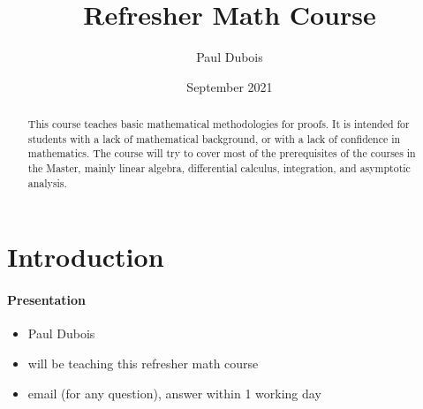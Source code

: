 \documentclass[11pt,a4paper]{report}
\title{Refresher Math Course}
\author{Paul Dubois}
\date{September 2021}
\begin{document}
	\maketitle
	
	\begin{abstract}
		This course teaches basic mathematical methodologies for proofs.
		It is intended for students with a lack of mathematical background, or with a lack of confidence in mathematics.
		The course will try to cover most of the prerequisites of the courses in the Master, mainly linear algebra, differential calculus, integration, and asymptotic analysis.
	\end{abstract}

	\tableofcontents
	\newpage
	
	\section*{Introduction}
	\paragraph{Presentation}
	\begin{itemize}
		\item Paul Dubois
		\item will be teaching this refresher math course
		\item email (for any question), answer within 1 working day
	\end{itemize}
\end{document}
